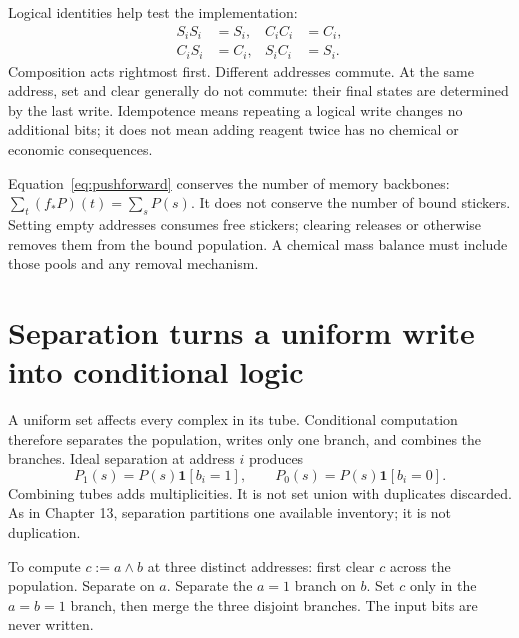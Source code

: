 Logical identities help test the implementation:
\begin{align}
 S_iS_i&=S_i,& C_iC_i&=C_i,\\
 C_iS_i&=C_i,& S_iC_i&=S_i.
 \label{eq:algebra}
\end{align}
Composition acts rightmost first. Different addresses commute. At the
same address, set and clear generally do not commute: their final states
are determined by the last write. Idempotence means repeating a logical
write changes no additional bits; it does not mean adding reagent twice
has no chemical or economic consequences.

Equation~\ref{eq:pushforward} conserves the number of memory backbones:
$\sum_t(f_*P)(t)=\sum_sP(s)$. It does not conserve the number of bound
stickers. Setting empty addresses consumes free stickers; clearing releases
or otherwise removes them from the bound population. A chemical mass
balance must include those pools and any removal mechanism.

\section{Separation turns a uniform write into conditional logic}
A uniform set affects every complex in its tube. Conditional computation
therefore separates the population, writes only one branch, and combines
the branches. Ideal separation at address $i$ produces
\begin{equation}
 P_1(s)=P(s)\mathbf1[b_i=1],\qquad
 P_0(s)=P(s)\mathbf1[b_i=0].
\end{equation}
Combining tubes adds multiplicities. It is not set union with duplicates
discarded. As in Chapter 13, separation partitions one available inventory;
it is not duplication.


To compute $c:=a\land b$ at three distinct addresses:
first clear $c$ across the population. Separate on $a$.
Separate the $a=1$ branch on $b$.
Set $c$ only in the $a=b=1$ branch, then merge the three disjoint branches.
The input bits are never written.


\begin{center}\end{center}

